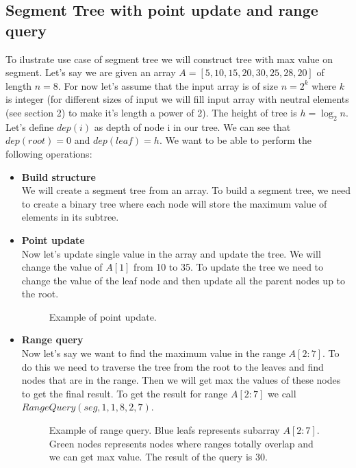\documentclass{article}
\begin{document}
\subsection{Segment Tree with point update and range query}
To ilustrate use case of segment tree we will construct tree with max value on segment.
Let's say we are given an array \(A = [5, 10, 15, 20, 30, 25, 28, 20]\) of length \(n = 8\).
For now let's assume that the input array is of size \(n = 2^{k}\) where \(k\) is integer (for different
sizes of input we will fill input array with neutral elements (see section 2) to make it's length a power of 2).
The height of tree is \(h = \log_2{n}\). Let's define \(dep(i)\) as depth of node i in our tree.
We can see that \(dep(root) = 0\) and \(dep(leaf) = h\).
We want to be able to perform the following operations:
\begin{itemize}
    \item \textbf{Build structure} \\
    We will create a segment tree from an array.
    To build a segment tree, we need to create a binary tree where each node will store the maximum value of elements in its subtree. \\
    

    \item \textbf{Point update} \\
    Now let's update single value in the array and update the tree.
    We will change the value of \(A[1]\) from 10 to 35.
    To update the tree we need to change the value of the leaf node 
    and then update all the parent nodes up to the root.
    
    \begin{figure}[H]
        \centering
        
        \caption{Example of point update.}
        \label{fig:segment_tree_2}
    \end{figure}

    \item \textbf{Range query} \\
    Now let's say we want to find the maximum value in the range \(A[2:7]\).
    To do this we need to traverse the tree from the root to the leaves and 
    find nodes that are in the range. Then we will get max the values of these nodes to get the final result.
    To get the result for range \(A[2:7]\) we call \(RangeQuery(seg, 1, 1, 8, 2, 7)\).

    

    \begin{figure}[H]
        \centering
        
        \caption{Example of range query. Blue leafs represents subarray \(A[2:7]\). Green nodes 
        represents nodes where ranges totally overlap and we can get max value. The result of the query is 30.}
        \label{fig:segment_tree_3}
    \end{figure}

\end{itemize}
\end{document}
